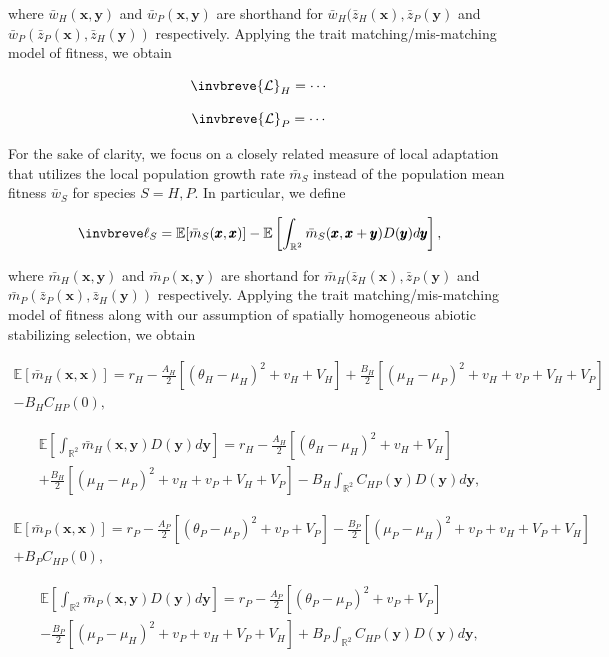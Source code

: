 \documentclass{article}
\begin{document}
where \(\bar w_H(\pmb x,\pmb y)\) and \(\bar w_P(\pmb x,\pmb y)\) are
shorthand for \(\bar w_H(\bar z_H(\pmb x),\bar z_P(\pmb y)\) and
\(\bar w_P(\bar z_P(\pmb x),\bar z_H(\pmb y))\) respectively. Applying
the trait matching/mis-matching model of fitness, we obtain

\[\invbreve{\mathcal L}_H=\cdots\]

\[\invbreve{\mathcal L}_P=\cdots\]

For the sake of clarity, we focus on a closely related measure of local
adaptation that utilizes the local population growth rate \(\bar m_S\)
instead of the population mean fitness \(\bar w_S\) for species
\(S=H,P\). In particular, we define

\[\invbreve\ell_S=\mathbb E[\bar m_S(\pmb x,\pmb x)]-\mathbb E\left[\int_{\mathbb R^2}\bar m_S(\pmb x,\pmb x+\pmb y)D(\pmb y)d\pmb y\right],\]

where \(\bar m_H(\pmb x,\pmb y)\) and \(\bar m_P(\pmb x,\pmb y)\) are
shortand for \(\bar m_H(\bar z_H(\pmb x),\bar z_P(\pmb y)\) and
\(\bar m_P(\bar z_P(\pmb x),\bar z_H(\pmb y))\) respectively. Applying
the trait matching/mis-matching model of fitness along with our
assumption of spatially homogeneous abiotic stabilizing selection, we
obtain

\begin{multline}
  \mathbb E[\bar m_H(\pmb x,\pmb x)]=
  r_H-\frac{A_H}{2}[(\theta_H-\mu_H)^2+v_H+V_H]
  +\frac{B_H}{2}[(\mu_H-\mu_P)^2+v_H+v_P+V_H+V_P] \\
  -B_HC_{HP}(0),
\end{multline}

\begin{multline}
  \mathbb E\left[\int_{\mathbb R^2}\bar m_H(\pmb x,\pmb y)
  D(\pmb y)d\pmb y\right]= 
  r_H-\frac{A_H}{2}[(\theta_H-\mu_H)^2+v_H+V_H] \\
  +\frac{B_H}{2}[(\mu_H-\mu_P)^2+v_H+v_P+V_H+V_P]
  -B_H\int_{\mathbb R^2}C_{HP}(\pmb y)D(\pmb y)d\pmb y,
\end{multline}

\begin{multline}
  \mathbb E[\bar m_P(\pmb x,\pmb x)]=
  r_P-\frac{A_P}{2}[(\theta_P-\mu_P)^2+v_P+V_P]
  -\frac{B_P}{2}[(\mu_P-\mu_H)^2+v_P+v_H+V_P+V_H] \\
  +B_P C_{HP}(0),
\end{multline}

\begin{multline}
  \mathbb E\left[\int_{\mathbb R^2}\bar m_P(\pmb x,\pmb y)
  D(\pmb y)d\pmb y\right]= 
  r_P-\frac{A_P}{2}[(\theta_P-\mu_P)^2+v_P+V_P] \\
  -\frac{B_P}{2}[(\mu_P-\mu_H)^2+v_P+v_H+V_P+V_H]
  +B_P\int_{\mathbb R^2}C_{HP}(\pmb y)D(\pmb y)d\pmb y,
\end{multline}
\end{document}
